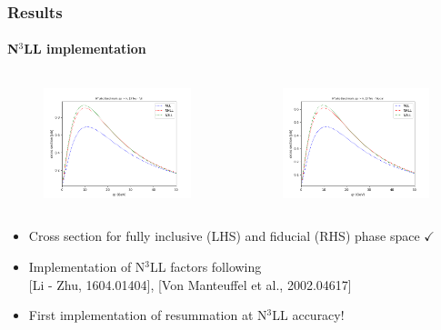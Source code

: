 \documentclass[aspectratio=43]{beamer}
\begin{document}
\begin{frame}
	
	\frametitle{Results}
	\framesubtitle{N$^{3}$LL implementation}
	
	\footnotesize
	
	\begin{columns}
		
		
		\begin{figure}
			\includegraphics[width = 6cm]{plots/part3/chapter7/hturbo_n3ll.png}
		\end{figure}
		
		
		\begin{figure}
			\includegraphics[width = 6cm]{plots/part3/chapter7/hturbo_n3ll_cuts.png}
		\end{figure}
		
	\end{columns}
	
	\begin{itemize}
		\item Cross section for fully inclusive (LHS) and fiducial (RHS) phase space {\color{darkgreen}$\checkmark$} 
		\item Implementation of N$^{3}$LL factors following \\
		{\color{blue}[Li - Zhu, 1604.01404]}, 
		{\color{blue}[Von Manteuffel et al., 2002.04617]}
		\item First implementation of resummation at N$^{3}$LL accuracy!
	\end{itemize}

\end{frame}
\end{document}
